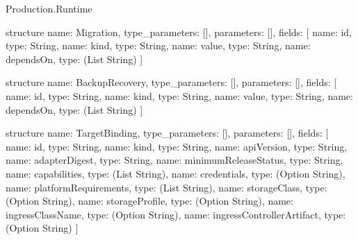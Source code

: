 \begin{lexlean}{Production.Runtime}
\begin{semanticmodule}
structure{
  name: Migration,
  type_parameters: [],
  parameters: [],
  fields: [
    {name: id, type: String},
    {name: kind, type: String},
    {name: value, type: String},
    {name: dependsOn, type: (List String)}
  ]
}

structure{
  name: BackupRecovery,
  type_parameters: [],
  parameters: [],
  fields: [
    {name: id, type: String},
    {name: kind, type: String},
    {name: value, type: String},
    {name: dependsOn, type: (List String)}
  ]
}

structure{
  name: TargetBinding,
  type_parameters: [],
  parameters: [],
  fields: [
    {name: id, type: String},
    {name: kind, type: String},
    {name: apiVersion, type: String},
    {name: adapterDigest, type: String},
    {name: minimumReleaseStatus, type: String},
    {name: capabilities, type: (List String)},
    {name: credentials, type: (Option String)},
    {name: platformRequirements, type: (List String)},
    {name: storageClass, type: (Option String)},
    {name: storageProfile, type: (Option String)},
    {name: ingressClassName, type: (Option String)},
    {name: ingressControllerArtifact, type: (Option String)}
  ]
}
\end{semanticmodule}
\end{lexlean}
